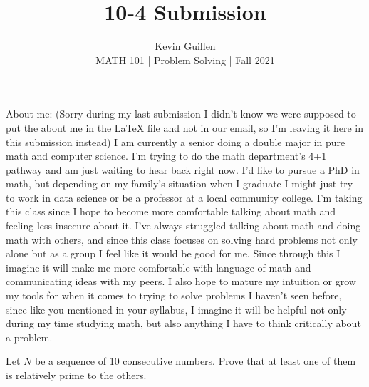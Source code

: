 \documentclass[11pt]{article}
\newenvironment{problem}[2][Problem\!]{\begin{trivlist}
\item[\hskip \labelsep {\bfseries #1}\hskip \labelsep {\bfseries #2}]}{\end{trivlist}}
\begin{document}
 
\title{10-4 Submission}
\author{Kevin Guillen\\[0.5em]
MATH 101 | Problem Solving | Fall 2021}
\date{} 
\maketitle
About me: (Sorry during my last submission I didn't know we were supposed to put the about me in the LaTeX file and not in our email, so I'm leaving it here in this submission instead)  I am currently a senior doing a double major in pure math and computer science. I'm trying to do the math department's 4+1 pathway and am just waiting to hear back right now. I'd like to pursue a PhD in math, but depending on my family's situation when I graduate I might just try to work in data science or be a professor at a local community college. I'm taking this class since I hope to become more comfortable talking about math and feeling less insecure about it. I've always struggled talking about math and doing math with others, and since this class focuses on solving hard problems not only alone but as a group I feel like it would be good for me. Since through this I imagine it will make me more comfortable with language of math and communicating ideas with my peers. I also hope to mature my intuition or grow my tools for when it comes to trying to solve problems I haven't seen before, since like you mentioned in your syllabus, I imagine it will be helpful not only during my time studying math, but also anything I have to think critically about a problem.
\begin{tcolorbox}
    \begin{problem}{IC 9/27 5.}
        Let $N$ be a sequence of 10 consecutive numbers. Prove that at least one of them is relatively prime to the others. 
    \end{problem}    
\end{tcolorbox}
\end{document}
